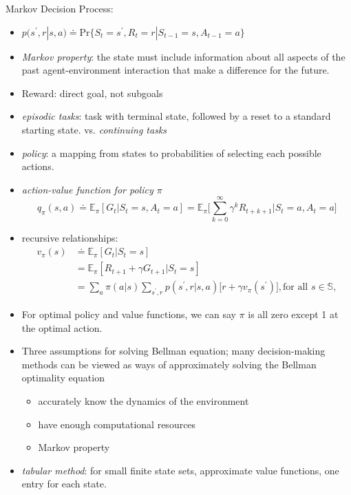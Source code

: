 \documentclass[12pt, letterpaper]{article}
\begin{document}
Markov Decision Process:
\begin{itemize}
	\item $p(s^{\prime},r|s,a) \doteq \textrm{Pr} \{ S_t=s^{\prime}, R_t = r | S_{t-1}=s, A_{t-1}=a \}$
	\item \textit{Markov property}: the state must include information about all aspects of the past agent-environment interaction that make a difference for the future.
	\item Reward: direct goal, not subgoals
	\item \textit{episodic tasks}: task with terminal state, followed by a reset to a standard starting state. vs. \textit{continuing tasks}
	\item \textit{policy}: a mapping from states to probabilities of selecting each possible actions.
	\item \textit{action-value function for policy $\pi$}
	\begin{equation}
	q_{\pi}(s,a) \doteq \mathbb{E}_{\pi} [ G_t | S_t = s,A_t = a] = \mathbb{E}_{\pi} \Big [ \sum_{k=0}^{\infty} \gamma^k R_{t+k+1} \Big | S_t = a, A_t = a \Big ]
	\end{equation}
	\item recursive relationships:
	\begin{equation}
	\begin{aligned}
	v_{\pi}(s) &\doteq \mathbb{E}_{\pi} [G_t | S_t = s] \\
	&= \mathbb{E}_{\pi} [ R_{t+1} + \gamma G_{t+1} | S_t = s] \\
	&= \sum_a \pi (a|s) \sum_{s^{\prime},r} p(s^{\prime},r|s,a) \big [ r+\gamma v_{\pi} (s^{\prime} ) \big ], \textrm{for all } s \in \mathbb{S}, 
	\end{aligned} 
	\end{equation}
	\item For optimal policy and value functions, we can say $\pi$ is all zero except 1 at the optimal action.
	\item Three assumptions for solving Bellman equation; many decision-making methods can be viewed as ways of approximately solving the Bellman optimality equation
		\begin{itemize}
			\item accurately know the dynamics of the environment
			\item have enough computational resources
			\item Markov property 
		\end{itemize}
	\item \textit{tabular method}: for small finite state sets, approximate value functions, one entry for each state.
\end{itemize}
\end{document}
